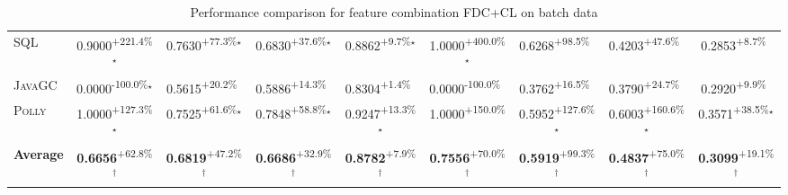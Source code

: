 \begin{table}[htbp]
\begin{tabular}{l|cccc|cccc}
\textsc{SQL} & \cellcolor{green!30}0.9000\textsuperscript{+221.4\%}$^\star$ & \cellcolor{green!30}0.7630\textsuperscript{+77.3\%}$^\star$ & \cellcolor{green!30}0.6830\textsuperscript{+37.6\%}$^\star$ & \cellcolor{green!30}0.8862\textsuperscript{+9.7\%}$^\star$ & \cellcolor{green!30}1.0000\textsuperscript{+400.0\%}$^\star$ & \cellcolor{green!30}0.6268\textsuperscript{+98.5\%}$^{\,\,\,}$ & \cellcolor{green!30}0.4203\textsuperscript{+47.6\%}$^{\,\,\,}$ & \cellcolor{green!30}0.2853\textsuperscript{+8.7\%}$^{\,\,\,}$ \\
\textsc{JavaGC} & \cellcolor{red!30}0.0000\textsuperscript{-100.0\%}$^\star$ & \cellcolor{green!30}0.5615\textsuperscript{+20.2\%}$^{\,\,\,}$ & \cellcolor{green!30}0.5886\textsuperscript{+14.3\%}$^{\,\,\,}$ & \cellcolor{green!30}0.8304\textsuperscript{+1.4\%}$^{\,\,\,}$ & \cellcolor{red!30}0.0000\textsuperscript{-100.0\%}$^{\,\,\,}$ & \cellcolor{green!30}0.3762\textsuperscript{+16.5\%}$^{\,\,\,}$ & \cellcolor{green!30}0.3790\textsuperscript{+24.7\%}$^{\,\,\,}$ & \cellcolor{green!30}0.2920\textsuperscript{+9.9\%}$^{\,\,\,}$ \\
\textsc{Polly} & \cellcolor{green!30}1.0000\textsuperscript{+127.3\%}$^\star$ & \cellcolor{green!30}0.7525\textsuperscript{+61.6\%}$^\star$ & \cellcolor{green!30}0.7848\textsuperscript{+58.8\%}$^\star$ & \cellcolor{green!30}0.9247\textsuperscript{+13.3\%}$^\star$ & \cellcolor{green!30}1.0000\textsuperscript{+150.0\%}$^{\,\,\,}$ & \cellcolor{green!30}0.5952\textsuperscript{+127.6\%}$^\star$ & \cellcolor{green!30}0.6003\textsuperscript{+160.6\%}$^\star$ & \cellcolor{green!30}0.3571\textsuperscript{+38.5\%}$^\star$ \\
\hline
\textbf{Average} & \cellcolor{green!30}\textbf{0.6656}\textsuperscript{+62.8\%}$^\dagger$ & \cellcolor{green!30}\textbf{0.6819}\textsuperscript{+47.2\%}$^\dagger$ & \cellcolor{green!30}\textbf{0.6686}\textsuperscript{+32.9\%}$^\dagger$ & \cellcolor{green!30}\textbf{0.8782}\textsuperscript{+7.9\%}$^\dagger$ & \cellcolor{green!30}\textbf{0.7556}\textsuperscript{+70.0\%}$^\dagger$ & \cellcolor{green!30}\textbf{0.5919}\textsuperscript{+99.3\%}$^\dagger$ & \cellcolor{green!30}\textbf{0.4837}\textsuperscript{+75.0\%}$^\dagger$ & \cellcolor{green!30}\textbf{0.3099}\textsuperscript{+19.1\%}$^\dagger$ \\
\hline
\end{tabular}
\caption{Performance comparison for feature combination FDC+CL on batch data}
\label{tab:combo_FDC_CL_performance_batch}
\end{table}